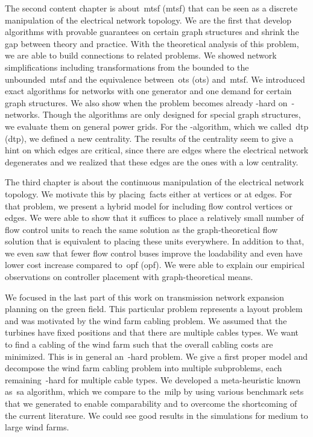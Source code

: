 The second content chapter is about~\acrlong{mtsf} (\gls{mtsf}) that can be seen
as a discrete manipulation of the electrical network topology. We are the first
that develop algorithms with provable guarantees on certain graph structures and
shrink the gap between theory and practice. With the theoretical analysis of
this problem, we are able to build connections to related problems. We showed
network simplifications including transformations from the bounded to the
unbounded~\gls{mtsf} and the equivalence between~\acrlong{ots} (\gls{ots})
and~\gls{mtsf}. We introduced exact algorithms for networks with one generator
and one demand for certain graph structures. We also show when the problem
becomes already \NP-hard on~\source-\sink networks. Though the algorithms are
only designed for special graph structures, we evaluate them on general power
grids. For the \source-\sink algorithm, which we called~\acrlong{dtp}
(\gls{dtp}), we defined a new centrality. The results of the centrality seem to
give a hint on which edges are critical, since there are edges where the
electrical network degenerates and we realized that these edges are the ones
with a low centrality.

The third chapter is about the continuous manipulation of the electrical network
topology. We motivate this by placing~\gls{facts} either at vertices or at
edges. For that problem, we present a hybrid model for including flow control
vertices or edges. We were able to show that it suffices to place a relatively
small number of flow control units to reach the same solution as the
graph-theoretical flow solution that is equivalent to placing these units
everywhere. In addition to that, we even saw that fewer flow control buses
improve the loadability and even have lower cost increase compared
to~\acrlong{opf} (\gls{opf}). We were able to explain our empirical observations
on controller placement with graph-theoretical means.

We focused in the last part of this work on transmission network expansion
planning on the green field. This particular problem represents a layout problem
and was motivated by the wind farm cabling problem. We assumed that the turbines
have fixed positions and that there are multiple cables types. We want to find a
cabling of the wind farm such that the overall cabling costs are minimized. This
is in general an~\NP-hard problem. We give a first proper model and decompose the
wind farm cabling problem into multiple subproblems, each remaining~\NP-hard for
multiple cable types. We developed a meta-heuristic known as~\acrlong{sa}
algorithm, which we compare to the~\gls{milp} by using various benchmark sets
that we generated to enable comparability and to overcome the shortcoming of the
current literature. We could see good results in the simulations for medium to
large wind farms.


